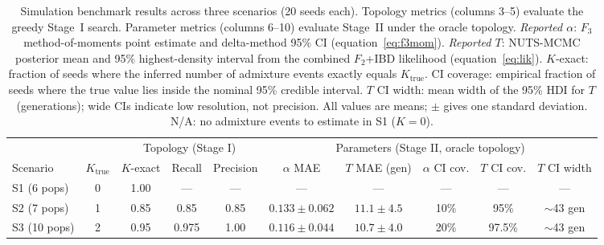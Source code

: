 \begin{table}[htbp]
\centering
\caption{Simulation benchmark results across three scenarios (20 seeds each).
Topology metrics (columns 3--5) evaluate the greedy Stage~I search.
Parameter metrics (columns 6--10) evaluate Stage~II under the oracle topology.
\emph{Reported $\alpha$}: $F_3$ method-of-moments point estimate and delta-method
95\% CI (equation~\ref{eq:f3mom}).
\emph{Reported $T$}: NUTS-MCMC posterior mean and 95\% highest-density interval
from the combined $F_2$+IBD likelihood (equation~\ref{eq:lik}).
$K$-exact: fraction of seeds where the inferred number of admixture events
exactly equals $K_{\mathrm{true}}$.
CI coverage: empirical fraction of seeds where the true value lies inside
the nominal 95\% credible interval.
$T$ CI width: mean width of the 95\% HDI for $T$ (generations);
wide CIs indicate low resolution, not precision.
All values are means; $\pm$ gives one standard deviation.
N/A: no admixture events to estimate in S1 ($K=0$).}
\label{tab:simulation}
\small
\begin{tabular}{lccccccccc}
\toprule
 & & \multicolumn{3}{c}{Topology (Stage I)} & \multicolumn{5}{c}{Parameters (Stage II, oracle topology)} \\
\cmidrule(lr){3-5}\cmidrule(lr){6-10}
Scenario & $K_{\mathrm{true}}$ & $K$-exact & Recall & Precision
         & $\alpha$ MAE & $T$ MAE (gen)
         & $\alpha$ CI cov. & $T$ CI cov. & $T$ CI width \\
\midrule
S1 (6 pops) & 0 & 1.00 & --- & --- & --- & --- & --- & --- & --- \\
S2 (7 pops) & 1 & 0.85 & 0.85 & 0.85
            & $0.133 \pm 0.062$ & $11.1 \pm 4.5$
            & 10\% & 95\% & $\sim$43 gen \\
S3 (10 pops) & 2 & 0.95 & 0.975 & 1.00
             & $0.116 \pm 0.044$ & $10.7 \pm 4.0$
             & 20\% & 97.5\% & $\sim$43 gen \\
\bottomrule
\end{tabular}
\end{table}
